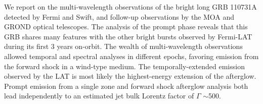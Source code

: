 


\bigskip



\bigskip

\noindent We report on the multi-wavelength observations of the bright long GRB 110731A detected by Fermi and Swift, and follow-up observations by the MOA and GROND optical telescopes. The analysis of the prompt phase reveals that this GRB shares many features with the other bright bursts observed by Fermi-LAT during its first 3 years on-orbit. The wealth of multi-wavelength observations allowed
temporal and spectral analyses in different epochs, favoring emission from the forward shock in a wind-type medium. The temporally-extended emission observed by the LAT is most likely the highest-energy extension of the afterglow. Prompt emission from a single zone and forward shock afterglow analysis both lead independently to an estimated jet bulk Lorentz factor of $\Gamma$ $\sim$500.

